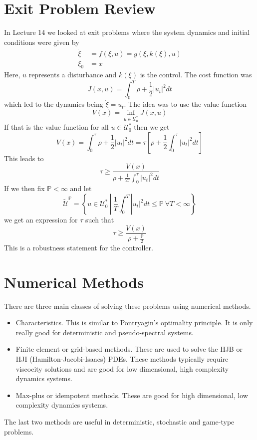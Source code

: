 
\mainmatter
\setcounter{page}{1}

\lectureseries[\course]{\course}

\date{November 19, 2009}

\setaddress

\setcounter{lecture}{14}
\setcounter{chapter}{14}


\section{Exit Problem Review}
In Lecture 14 we looked at exit problems where the system dynamics and initial conditions were given by
\begin{align*}
\dot{\xi} &= f(\xi,u) = g(\xi,k(\xi),u) \\
\xi_0 &= x
\end{align*}
Here, $u$ represents a disturbance and $k(\xi)$ is the control. The cost function was
$$J(x,u) = \int_0^T\rho+\frac{1}{2}|u_t|^2dt$$
which led to the dynamics being $\dot{\xi}=u_t$. The idea was to use the value function
$$V(x) = \inf_{u\in\mathcal{U}_0^\ast}J(x,u)$$
If that is the value function for all $u\in\mathcal{U}_0^\ast$ then we get
$$V(x) = \int_0^\tau \rho + \frac{1}{2}|u_t|^2dt = \tau\left[\rho+\frac{1}{2}\int_0^\tau|u_t|^2dt\right]$$
This leads to
$$\tau\geq\frac{V(x)}{\rho+\frac{1}{2\tau}\int_0^\tau|u_t|^2dt}$$
If we then fix $\mathbb{P}<\infty$ and let
$$\tilde{\mathcal{U}}^\mathbb{P} = \left\lbrace u\in\mathcal{U}_0^\ast ~|~ \frac{1}{T}\int_0^T|u_t|^2dt \leq \mathbb{P} ~\forall T<\infty \right\rbrace$$
we get an expression for $\tau$ such that
$$\tau\geq \frac{V(x)}{\rho+\frac{\mathbb{P}}{2}}$$
This is a robustness statement for the controller.

\section{Numerical Methods}
There are three main classes of solving these problems using numerical methods.
\begin{itemize}
\item Characteristics. This is similar to Pontryagin's optimality principle. It is only really good for deterministic and pseudo-spectral systems.
\item Finite element or grid-based methods. These are used to solve the HJB or HJI (Hamilton-Jacobi-Isaacs) PDEs.  These methods typically require viscocity solutions and are good for low dimensional, high complexity dynamics systems.
\item Max-plus or idempotent methods. These are good for high dimensional, low complexity dynamics systems.
\end{itemize}
The last two methods are useful in deterministic, stochastic and game-type problems.

